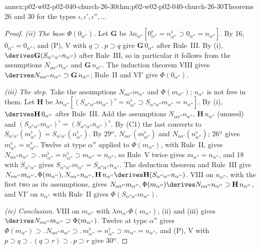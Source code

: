 \begin{annexitem}{annex:p02-w02-p02-040-church-26-30}{thm:p02-w02-p02-040-church-26-30}{Theorems 26 and 30 for the types \(\iota,\iota',\iota'',\ldots\)}
\begin{proof}
\emph{(ii) The base \(\Phi(0_{\alpha''})\).}  Let \(\mathbf G\) be
\(\lambda n_{\alpha''}[0_{\alpha''}^\flat=n_{\alpha''}^\flat\supset0_{\alpha''}=n_{\alpha''}]\).
By 16, \(0_{\alpha''}=0_{\alpha''}\), and (P), V with \(q\supset.\,p\supset q\)
give \(\mathbf G\,0_{\alpha''}\) after Rule~III.  By (i),
\(\derives\mathbf G(S_{\alpha''\alpha''}n_{\alpha''})\) after Rule~III, so in
particular it follows from the assumptions \(N_{o\alpha''}n_{\alpha''}\) and
\(\mathbf G\,n_{\alpha''}\).  The induction theorem VIII gives
\(\derives N_{o\alpha''}n_{\alpha''}\supset\mathbf G\,n_{\alpha''}\); Rule~II and
VI\('\) give \(\Phi(0_{\alpha''})\).

\emph{(iii) The step.}  Take the assumptions \(N_{o\alpha''}m_{\alpha''}\) and
\(\Phi(m_{\alpha''})\); \(n_{\alpha''}\) is not free in them.  Let \(\mathbf H\) be
\(\lambda n_{\alpha''}[(S_{\alpha''\alpha''}m_{\alpha''})^\flat=n_{\alpha''}^\flat\supset S_{\alpha''\alpha''}m_{\alpha''}=n_{\alpha''}]\).
By (i), \(\derives\mathbf H\,0_{\alpha''}\) after Rule~III.  Add the assumptions
\(N_{o\alpha''}n_{\alpha''}\), \(\mathbf H\,n_{\alpha''}\) (unused) and
\((S_{\alpha''\alpha''}m_{\alpha''})^\flat=(S_{\alpha''\alpha''}n_{\alpha''})^\flat\).
By (C1) the last converts to
\(S_{\alpha'\alpha'}(m_{\alpha''}^\flat)=S_{\alpha'\alpha'}(n_{\alpha''}^\flat)\).
By 29\(^\alpha\), \(N_{o\alpha'}(m_{\alpha''}^\flat)\) and \(N_{o\alpha'}(n_{\alpha''}^\flat)\);
26\(^\alpha\) gives \(m_{\alpha''}^\flat=n_{\alpha''}^\flat\).  Twelve at type
\(\alpha''\) applied to \(\Phi(m_{\alpha''})\), with Rule~II, gives
\(N_{o\alpha''}n_{\alpha''}\supset.\,m_{\alpha''}^\flat=n_{\alpha''}^\flat\supset m_{\alpha''}=n_{\alpha''}\),
so Rule~V twice gives \(m_{\alpha''}=n_{\alpha''}\), and 18 with
\(S_{\alpha''\alpha''}\) gives \(S_{\alpha''\alpha''}m_{\alpha''}=S_{\alpha''\alpha''}n_{\alpha''}\).
The deduction theorem and Rule~III give
\(N_{o\alpha''}m_{\alpha''},\Phi(m_{\alpha''}),N_{o\alpha''}n_{\alpha''},\mathbf H\,n_{\alpha''}\derives\mathbf H(S_{\alpha''\alpha''}n_{\alpha''})\).
VIII on \(n_{\alpha''}\), with the first two as its assumptions, gives
\(N_{o\alpha''}m_{\alpha''},\Phi(m_{\alpha''})\derives N_{o\alpha''}n_{\alpha''}\supset\mathbf H\,n_{\alpha''}\),
and VI\('\) on \(n_{\alpha''}\) with Rule~II gives \(\Phi(S_{\alpha''\alpha''}m_{\alpha''})\).

\emph{(iv) Conclusion.}  VIII on \(m_{\alpha''}\) with
\(\lambda m_{\alpha''}\Phi(m_{\alpha''})\), (ii) and (iii) gives
\(\derives N_{o\alpha''}m_{\alpha''}\supset\Phi(m_{\alpha''})\).  Twelve at type
\(\alpha''\) gives
\(\Phi(m_{\alpha''})\supset.\,N_{o\alpha''}n_{\alpha''}\supset.\,m_{\alpha''}^\flat=n_{\alpha''}^\flat\supset m_{\alpha''}=n_{\alpha''}\),
and (P), V with \(p\supset q\supset.\,(q\supset r)\supset.\,p\supset r\) give 30\(^\alpha\).


\end{proof}
\end{annexitem}
